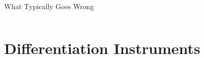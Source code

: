 \documentclass[aspectratio=169,t,11pt,table]{beamer}
\begin{document}
\begin{frame}{What Typically Goes Wrong}
\begin{columns}
\begin{column}{0.35\textwidth}
        \end{column}
    \end{columns}
\end{frame}

\section{Differentiation Instruments}
\end{document}
